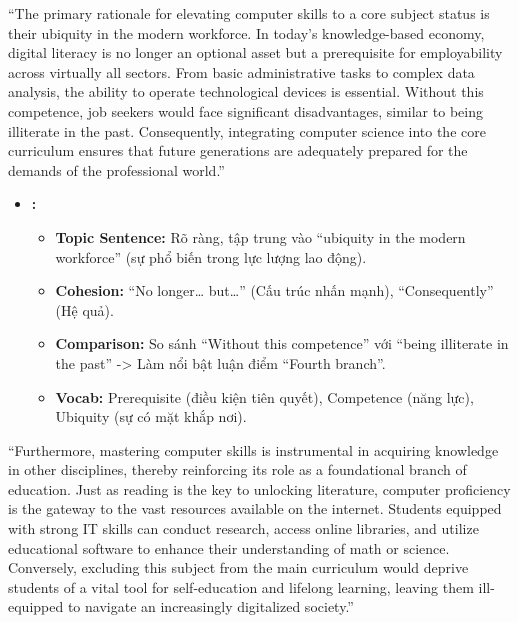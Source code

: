 
``The primary rationale for elevating computer skills to a core subject
status is their ubiquity in the modern workforce. In today's
knowledge-based economy, digital literacy is no longer an optional asset
but a prerequisite for employability across virtually all sectors. From
basic administrative tasks to complex data analysis, the ability to
operate technological devices is essential. Without this competence, job
seekers would face significant disadvantages, similar to being
illiterate in the past. Consequently, integrating computer science into
the core curriculum ensures that future generations are adequately
prepared for the demands of the professional world.''

\begin{itemize}
\tightlist
\item
  \textbf{:}

  \begin{itemize}
  \tightlist
  \item
    \textbf{Topic Sentence:} Rõ ràng, tập trung vào ``ubiquity in the
    modern workforce'' (sự phổ biến trong lực lượng lao động).
  \item
    \textbf{Cohesion:} ``No longer\ldots{} but\ldots{}'' (Cấu trúc nhấn
    mạnh), ``Consequently'' (Hệ quả).
  \item
    \textbf{Comparison:} So sánh ``Without this competence'' với ``being
    illiterate in the past'' -\textgreater{} Làm nổi bật luận điểm
    ``Fourth branch''.
  \item
    \textbf{Vocab:} Prerequisite (điều kiện tiên quyết), Competence
    (năng lực), Ubiquity (sự có mặt khắp nơi).
  \end{itemize}
\end{itemize}


``Furthermore, mastering computer skills is instrumental in acquiring
knowledge in other disciplines, thereby reinforcing its role as a
foundational branch of education. Just as reading is the key to
unlocking literature, computer proficiency is the gateway to the vast
resources available on the internet. Students equipped with strong IT
skills can conduct research, access online libraries, and utilize
educational software to enhance their understanding of math or science.
Conversely, excluding this subject from the main curriculum would
deprive students of a vital tool for self-education and lifelong
learning, leaving them ill-equipped to navigate an increasingly
digitalized society.''

